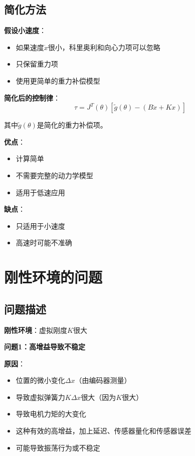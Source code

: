 \documentclass[12pt,a4paper]{article}
\begin{document}
\subsection{简化方法}

\textbf{假设小速度}：
\begin{itemize}
\item 如果速度$\dot{x}$很小，科里奥利和向心力项可以忽略
\item 只保留重力项
\item 使用更简单的重力补偿模型
\end{itemize}

\textbf{简化后的控制律}：
\begin{equation}
\tau = J^T(\theta)\left[\tilde{g}(\theta) - (B\dot{x} + Kx)\right]
\end{equation}

其中$\tilde{g}(\theta)$是简化的重力补偿项。

\textbf{优点}：
\begin{itemize}
\item 计算简单
\item 不需要完整的动力学模型
\item 适用于低速应用
\end{itemize}

\textbf{缺点}：
\begin{itemize}
\item 只适用于小速度
\item 高速时可能不准确
\end{itemize}

\section{刚性环境的问题}

\subsection{问题描述}

\textbf{刚性环境}：虚拟刚度$K$很大

\textbf{问题1：高增益导致不稳定}

\textbf{原因}：
\begin{itemize}
\item 位置的微小变化$\Delta x$（由编码器测量）
\item 导致虚拟弹簧力$K\Delta x$很大（因为$K$很大）
\item 导致电机力矩的大变化
\item 这种有效的高增益，加上延迟、传感器量化和传感器误差
\item 可能导致振荡行为或不稳定
\end{itemize}
\end{document}
